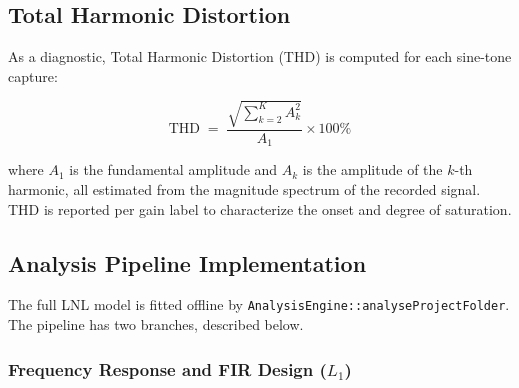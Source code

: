 \documentclass[11pt, letterpaper]{article}
\begin{document}
\subsection{Total Harmonic Distortion}
\label{sec:thd}

As a diagnostic, Total Harmonic Distortion (THD) is computed for each
sine-tone capture:

\begin{equation}
    \text{THD} \;=\;
    \frac{\sqrt{\displaystyle\sum_{k=2}^{K} A_k^2}}{A_1} \times 100\%
    \label{eq:thd}
\end{equation}

where $A_1$ is the fundamental amplitude and $A_k$ is the amplitude of the
$k$-th harmonic, all estimated from the magnitude spectrum of the recorded signal.
THD is reported per gain label to characterize the onset and degree of saturation.

\subsection{Analysis Pipeline Implementation}
\label{sec:analysis_impl}

The full LNL model is fitted offline by
\texttt{AnalysisEngine::analyseProjectFolder}.  The pipeline has two
branches, described below.

\subsubsection{Frequency Response and FIR Design ($L_1$)}
\label{sec:analysis_fr}
\end{document}

